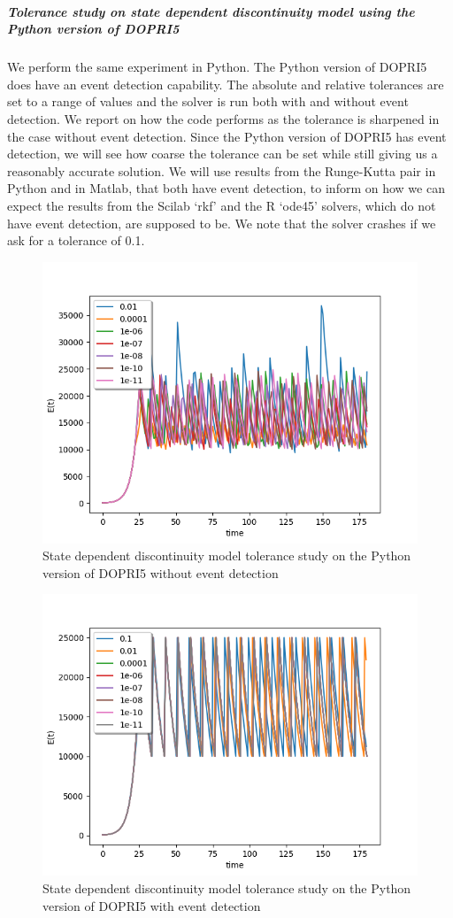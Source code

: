 \subparagraph{Tolerance study on state dependent discontinuity model using the Python version of DOPRI5}
We perform the same experiment in Python. The Python version of DOPRI5 does have an event detection capability. The absolute and relative tolerances are set to a range of values and the solver is run both with and without event detection. We report on how the code performs as the tolerance is sharpened in the case without event detection. Since the Python version of DOPRI5 has event detection, we will see how coarse the tolerance can be set while still giving us a reasonably accurate solution. We will use results from the Runge-Kutta pair in Python and in Matlab, that both have event detection, to inform on how we can expect the results from the Scilab `rkf' and  the R `ode45' solvers, which do not have event detection, are supposed to be. We note that the solver crashes if we ask for a tolerance of 0.1.

\begin{figure}[h]
\centering
\includegraphics[width=0.7\linewidth]{./figures/tolerance_state_rk45_no_event_py}
\caption{State dependent discontinuity model tolerance study on the Python version of DOPRI5 without event detection}
\label{fig:tolerance_state_rk45_no_event_py}
\end{figure}

\begin{figure}[h]
\centering
\includegraphics[width=0.7\linewidth]{./figures/tolerance_state_rk45_with_event_py}
\caption{State dependent discontinuity model tolerance study on the Python version of DOPRI5 with event detection}
\label{fig:tolerance_state_rk45_with_event_py}
\end{figure}

